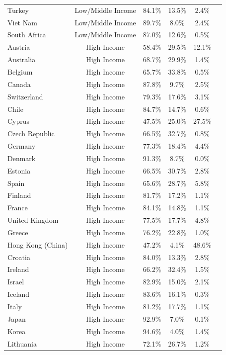 \begin{center}
{\begin{tabular}{lccc@{\hskip 0.55in}cc}
			Turkey & Low/Middle Income & 84.1\% & 13.5\% & 2.4\% \\
			Viet Nam & Low/Middle Income & 89.7\% & 8.0\% & 2.4\% \\
			South Africa & Low/Middle Income & 87.0\% & 12.6\% & 0.5\% \\
			Austria & High Income & 58.4\% & 29.5\% & 12.1\% \\
			Australia & High Income & 68.7\% & 29.9\% & 1.4\% \\
			Belgium & High Income & 65.7\% & 33.8\% & 0.5\% \\
			Canada & High Income & 87.8\% & 9.7\% & 2.5\% \\
			Switzerland & High Income & 79.3\% & 17.6\% & 3.1\% \\
			Chile & High Income & 84.7\% & 14.7\% & 0.6\% \\
			Cyprus & High Income & 47.5\% & 25.0\% & 27.5\% \\
			Czech Republic & High Income & 66.5\% & 32.7\% & 0.8\% \\
			Germany & High Income & 77.3\% & 18.4\% & 4.4\% \\
			Denmark & High Income & 91.3\% & 8.7\% & 0.0\% \\
			Estonia & High Income & 66.5\% & 30.7\% & 2.8\% \\
			Spain & High Income & 65.6\% & 28.7\% & 5.8\% \\
			Finland & High Income & 81.7\% & 17.2\% & 1.1\% \\
			France & High Income & 84.1\% & 14.8\% & 1.1\% \\
			United Kingdom & High Income & 77.5\% & 17.7\% & 4.8\% \\
			Greece & High Income & 76.2\% & 22.8\% & 1.0\% \\
			Hong Kong (China) & High Income & 47.2\% & 4.1\% & 48.6\% \\
			Croatia & High Income & 84.0\% & 13.3\% & 2.8\% \\
			Ireland & High Income & 66.2\% & 32.4\% & 1.5\% \\
			Israel & High Income & 82.9\% & 15.0\% & 2.1\% \\
			Iceland & High Income & 83.6\% & 16.1\% & 0.3\% \\
			Italy & High Income & 81.2\% & 17.7\% & 1.1\% \\
			Japan & High Income & 92.9\% & 7.0\% & 0.1\% \\
			Korea & High Income & 94.6\% & 4.0\% & 1.4\% \\
			Lithuania & High Income & 72.1\% & 26.7\% & 1.2\% \\

\end{tabular}}
\end{center}
